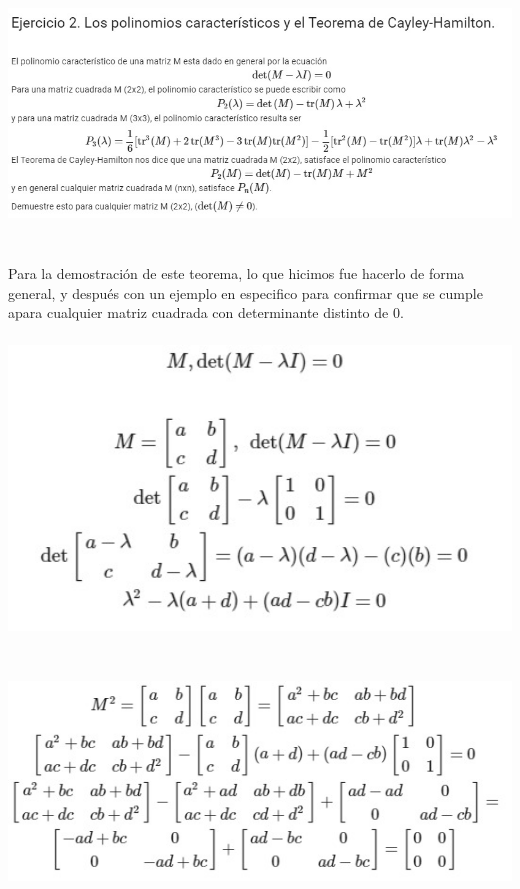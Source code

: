\documentclass[12pt]{article}
\begin{document}
    \begin{center}
	\includegraphics[height=7cm]{E2.jpeg}\\
    \end{center}
    
Para la demostración de este teorema, lo que hicimos fue hacerlo de forma general, y después con un ejemplo en especifico para confirmar que se cumple apara cualquier matriz cuadrada con determinante distinto de 0.\\

    \begin{center}
	\includegraphics[height=8cm]{E.2.1.jpeg}\\
    \end{center}

    \begin{center}
	\includegraphics[height=6.5cm]{E2.2.jpeg}\\
    \end{center}
    
\end{document}
